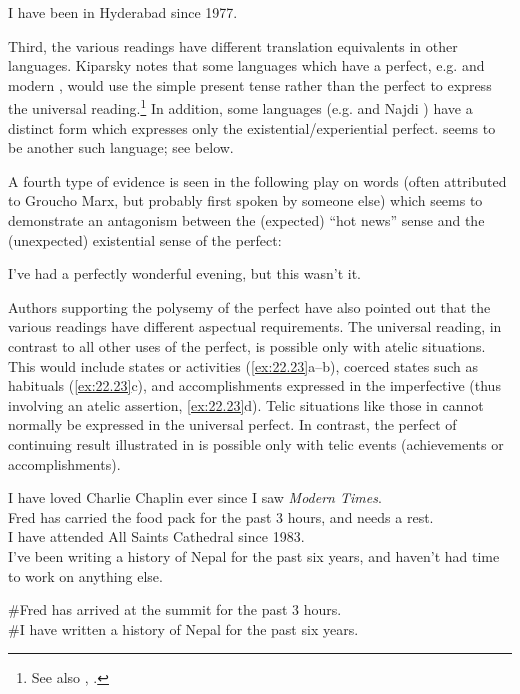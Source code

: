 \ea \label{ex:22.21}
I have been in Hyderabad since 1977.
\z


Third, the various readings have different translation equivalents in other languages. Kiparsky notes that some languages which have a perfect, e.g.  and modern , would use the simple present tense rather than the perfect to express the universal reading.\footnote{See also \citet{Comrie1976}, \citet{Klein2009}.} In addition, some languages (e.g.  and Najdi ) have a distinct form which expresses only the existential/experiential perfect.  seems to be another such language; see  below.



A fourth type of evidence is seen in the following play on words (often attributed to Groucho Marx, but probably first spoken by someone else) which seems to demonstrate an antagonism between the (expected) “hot news” sense and the (unexpected) existential sense of the perfect:


\ea \label{ex:22.22}
I’ve had a perfectly wonderful evening, but this wasn’t it.
\z


Authors supporting the polysemy of the perfect have also pointed out that the various readings have different aspectual requirements. The universal reading, in contrast to all other uses of the perfect, is possible only with atelic situations. This would include states or activities (\ref{ex:22.23}a--b), coerced states such as habituals (\ref{ex:22.23}c), and accomplishments expressed in the imperfective (thus involving an atelic assertion, \ref{ex:22.23}d). Telic situations like those in  cannot normally be expressed in the universal perfect. In contrast, the perfect of continuing result illustrated in  is possible only with telic events (achievements or accomplishments).


\ea \label{ex:22.23}
\ea I have loved Charlie Chaplin ever since I saw \textit{Modern Times}.\\
\ex Fred has carried the food pack for the past 3 hours, and needs a rest.\\
\ex I have attended All Saints Cathedral since 1983.\\
\ex I’ve been writing a history of Nepal for the past six years, and haven’t had time to work on anything else.
                       \z
\z

\ea \label{ex:22.24}
\ea \#Fred has arrived at the summit for the past 3 hours.\\
\ex \#I have written a history of Nepal for the past six years.
                       \z
\z


